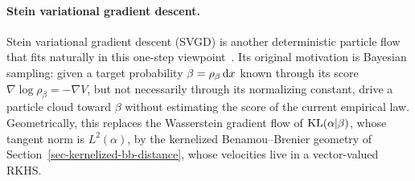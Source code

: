 \paragraph{Stein variational gradient descent.}\label{sec-svgd-generative-flow}
Stein variational gradient descent (SVGD) is another deterministic particle flow that fits naturally in this one-step viewpoint~\cite{LiuWang2016SVGD}. Its original motivation is Bayesian sampling: given a target probability $\beta=\rho_\beta\,\mathrm{d} x$ known through its score $\nabla\log\rho_\beta=-\nabla V$, but not necessarily through its normalizing constant, drive a particle cloud toward $\beta$ without estimating the score of the current empirical law. Geometrically, this replaces the Wasserstein gradient flow of $\operatorname{KL}(\alpha|\beta)$, whose tangent norm is $L^2(\alpha)$, by the kernelized Benamou--Brenier geometry of Section~\ref{sec-kernelized-bb-distance}, whose velocities live in a vector-valued RKHS.

